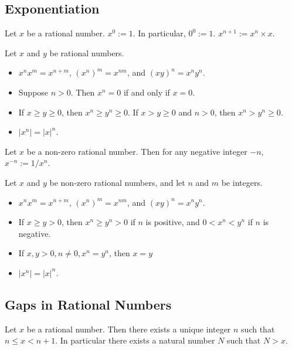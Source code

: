 \documentclass{blog}
\begin{document}
\subsection{Exponentiation}
\begin{definition}[exponentiation]
  Let $x$ be a rational number.
  $x^{0} := 1$. In particular, $0^{0} := 1$.
  $x^{n + 1} := x^{n} \times x$.
\end{definition}

\begin{proposition}
  Let $x$ and $y$ be rational numbers.
  \begin{itemize}
  \item $x^{n} x^{m} = x^{n + m}$, $(x^{n})^{m} = x^{nm}$, and $(x y)^{n} = x^{n} y^{n}$.
  \item Suppose $n > 0$. Then $x^{n} = 0$ if and only if $x = 0$.
  \item If $x \geq y \geq 0$, then $x^{n} \geq y^{n} \geq 0$.
    If $x > y \geq 0$ and $n > 0$, then $x^{n} > y^{n} \geq 0$.
  \item $|x^{n}| = |x|^{n}$.
  \end{itemize}
\end{proposition}

\begin{definition}
  Let $x$ be a non-zero rational number.
  Then for any negative integer $-n$, $x^{-n} := 1 / x^{n}$.
\end{definition}

\begin{proposition}
  Let $x$ and $y$ be non-zero rational numbers, and let $n$ and $m$ be integers.
  \begin{itemize}
  \item $x^{n} x^{m} = x^{n + m}$, $(x^{n})^{m} = x^{nm}$, and $(x y)^{n} = x^{n} y^{n}$.
  \item If $x \geq y > 0$, then $x^{n} \geq y^{n} > 0$ if $n$ is positive,
    and $0 < x^{n} < y^{n}$ if $n$ is negative.
  \item If $x, y > 0, n \neq 0, x^{n} = y^{n}$, then $x = y$
  \item $|x^{n}| = |x|^{n}$.
  \end{itemize}
\end{proposition}

\subsection{Gaps in Rational Numbers}
\begin{proposition}
  \label{PROP:INTEGER_PART_RATIONAL}
  Let $x$ be a rational number.
  Then there exists a unique integer $n$ such that $n \leq x < n + 1$.
  In particular there exists a natural number $N$ such that $N > x$.
\end{proposition}
\end{document}
